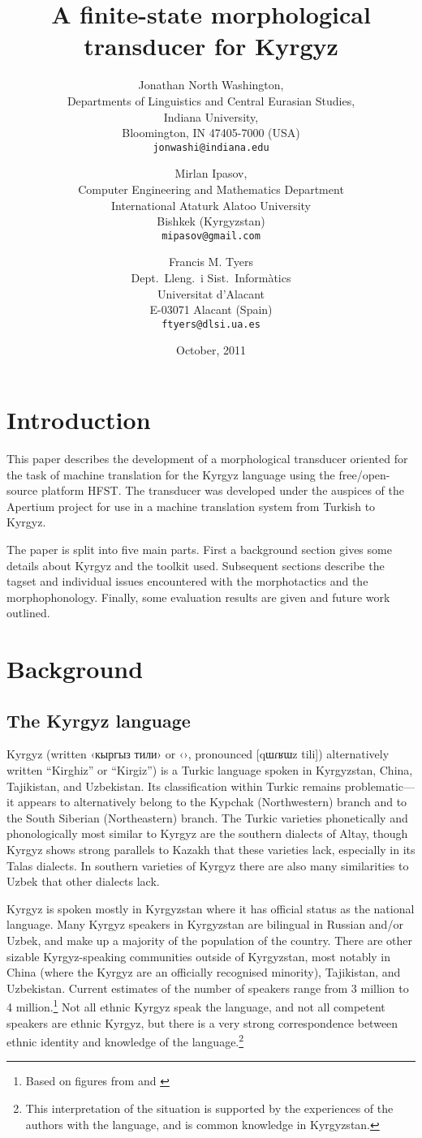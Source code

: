\documentclass[10pt,a4paper,twocolumn]{article}
\title{A finite-state morphological transducer for Kyrgyz}
\author {Jonathan North Washington, \\
Departments of Linguistics and Central Eurasian Studies,\\
Indiana University,\\
Bloomington, IN 47405-7000 (USA)\\
\texttt{jonwashi@indiana.edu} \and 
Mirlan Ipasov,\\
Computer Engineering and Mathematics Department\\
International Ataturk Alatoo University\\
Bishkek (Kyrgyzstan)\\
\texttt{mipasov@gmail.com} \and
Francis M. Tyers\\
Dept.\ Lleng.\ i Sist.\ Informàtics \\  
Universitat d'Alacant\\
E-03071 Alacant (Spain)\\
\texttt{ftyers@dlsi.ua.es} 
 }
\date{October, 2011}
\begin{document}
\maketitle{}
\thispagestyle{empty}

\section{Introduction}
This paper describes the development of a morphological transducer oriented for the task of machine translation for the Kyrgyz language using the free/open-source platform HFST. The transducer was developed under the auspices of the Apertium \cite{forcada2011} project for use in a machine translation system from Turkish to Kyrgyz.

The paper is split into five main parts. First a background section gives some details about Kyrgyz and the toolkit used. Subsequent sections describe the tagset and individual issues encountered with the morphotactics and the morphophonology. Finally, some evaluation results are given and future work outlined.

\section{Background}
\subsection{The Kyrgyz language}
Kyrgyz (written ‹кыргыз тили› or ‹›, pronounced [qɯɾʁɯz tili]) alternatively written ``Kirghiz'' or ``Kirgiz'') is a Turkic language spoken in Kyrgyzstan, China, Tajikistan, and Uzbekistan.  Its classification within Turkic remains problematic—it appears to alternatively belong to the Kypchak (Northwestern) branch and to the South Siberian (Northeastern) branch.  The Turkic varieties phonetically and phonologically most similar to Kyrgyz are the southern dialects of Altay, though Kyrgyz shows strong parallels to Kazakh that these varieties lack, especially in its Talas dialects.  In southern varieties of Kyrgyz there are also many similarities to Uzbek that other dialects lack.

Kyrgyz is spoken mostly in Kyrgyzstan where it has official status as the national language.  Many Kyrgyz speakers in Kyrgyzstan are bilingual in Russian and/or Uzbek, and make up a majority of the population of the country.  There are other sizable Kyrgyz-speaking communities outside of Kyrgyzstan, most notably in China (where the Kyrgyz are an officially recognised minority), Tajikistan, and Uzbekistan.  Current estimates of the number of speakers range from 3 million to 4 million.\footnote{Based on figures from \cite{lewis2009} and \cite{factbook2009}}  Not all ethnic Kyrgyz speak the language, and not all competent speakers are ethnic Kyrgyz, but there is a very strong correspondence between ethnic identity and knowledge of the language.\footnote{This interpretation of the situation is supported by the experiences of the authors with the language, and is common knowledge in Kyrgyzstan.}
\end{document}
